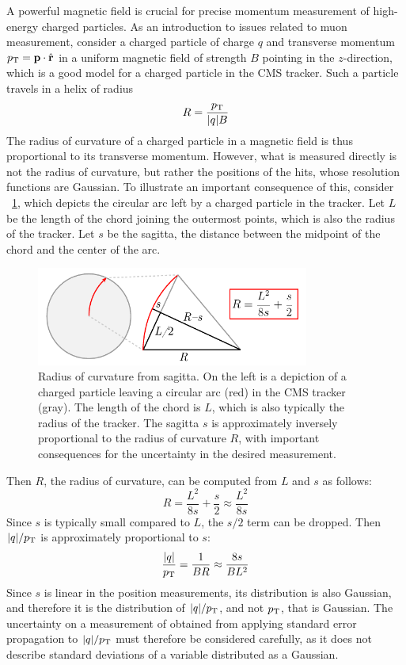 A powerful magnetic field is crucial for precise momentum measurement of high-energy charged particles.
As an introduction to issues related to muon \pT measurement, consider a charged particle of charge $q$ and transverse momentum $p_{\mathrm{T}} = \mathbf{p} \cdot \hat{\mathbf{r}}$ in a uniform magnetic field of strength $B$ pointing in the $z$-direction, which is a good model for a charged particle in the CMS tracker. Such a particle travels in a helix of radius
\begin{equation}
  R = \frac{p_{\mathrm{T}}}{|q|B}
  \label{cms:radius}
\end{equation}
The radius of curvature of a charged particle in a magnetic field is thus proportional to its transverse momentum.
However, what is measured directly is not the radius of curvature, but rather the positions of the hits, whose resolution functions are Gaussian.
To illustrate an important consequence of this, consider \Fig~\ref{cms:sagitta}, which depicts the circular arc left by a charged particle in the tracker.
Let $L$ be the length of the chord joining the outermost points, which is also the radius of the tracker.
Let $s$ be the sagitta, \ie the distance between the midpoint of the chord and the center of the arc.
\begin{figure}[tpb]
  \centering
  \includegraphics[width=0.8\textwidth]{figures/cms/Sagitta.pdf}
  \caption[Radius of curvature from sagitta.]{Radius of curvature from sagitta. On the left is a depiction of a charged particle leaving a circular arc (red) in the CMS tracker (gray). The length of the chord is $L$, which is also typically the radius of the tracker. The sagitta $s$ is approximately inversely proportional to the radius of curvature $R$, with important consequences for the uncertainty in the desired \pT measurement.}
  \label{cms:sagitta}
\end{figure}
Then $R$, the radius of curvature, can be computed from $L$ and $s$ as follows:
\begin{equation}
  R = \frac{L^2}{8s} + \frac{s}{2} \approx \frac{L^2}{8s}
  \label{cms:eqn_sagitta}
\end{equation}
Since $s$ is typically small compared to $L$, the $s/2$ term can be dropped.
Then $|q|/p_{\mathrm{T}}$ is approximately proportional to $s$:
\begin{align}
  \frac{|q|}{p_{\mathrm{T}}} = \frac{1}{BR} \approx \frac{8s}{BL^2}
  \label{cms:pTError}
\end{align}
Since $s$ is linear in the position measurements, its distribution is also Gaussian, and therefore it is the distribution of $|q|/p_{\mathrm{T}}$, and not $p_{\mathrm{T}}$, that is Gaussian.
The uncertainty on a measurement of \pT obtained from applying standard error propagation to $|q|/p_{\mathrm{T}}$ must therefore be considered carefully, as it does not describe standard deviations of a variable distributed as a Gaussian.

